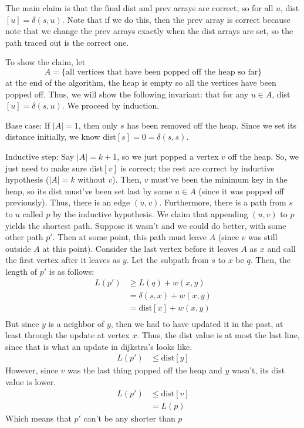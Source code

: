 \begin{algothm}
    The main claim is that the final dist and prev arrays are correct, so for all $u$, dist$[u] = \delta(s, u)$. Note that if we do this,
    then the prev array is correct because note that we change the prev arrays exactly when the dist arrays are set, so the path traced out
    is the correct one.

    To show the claim, let \[A = \{ \text{all vertices that have been popped off the heap so far} \}\]
    at the end of the algorithm, the heap is empty so all the vertices have been popped off. Thus, we will show the following invariant:
    that for any $u \in A$, dist$[u] = \delta(s, u)$. We proceed by induction.

    Base case: If $|A| = 1$, then only $s$ has been removed off the heap. Since we set its distance initially, we know dist$[s] = 0 = \delta(s, s)$.

    Inductive step: Say $|A| = k + 1$, so we just popped a vertex $v$ off the heap. So, we just need to make sure dist$[v]$ is correct; the rest are correct
    by inductive hypothesis ($|A| = k$ without $v$). Then, $v$ must've been the minimum key in the heap, so its dist must've been set last by some $u \in A$ (since it was popped off previously).
    Thus, there is an edge $(u, v)$. Furthermore, there is a path from $s$ to $u$ called $p$ by the inductive hypothesis. We claim that appending $(u, v)$ to $p$
    yields the shortest path. Suppose it wasn't and we could do better, with some other path $p'$. Then at some point, this path must leave $A$ (since $v$ was still outside $A$ at this point).
    Consider the last vertex before it leaves $A$ as $x$ and call the first vertex after it leaves as $y$. Let the subpath from $s$ to $x$ be $q$. Then, the length of $p'$ is as follows:
    \begin{align*}
        L(p') &\geq L(q) + w(x, y) \\
        &= \delta(s, x) + w(x, y) \\
        &= \text{dist}[x] + w(x, y) \\
    \end{align*} 
    But since $y$ is a neighbor of $y$, then we had to have updated it in the past, at least through the update at vertex $x$. Thus,
    the dist value is at most the last line, since that is what an update in dijkstra's looks like.
    \begin{align*}
        L(p') &\leq \text{dist}[y]
    \end{align*}
    However, since $v$ was the last thing popped off the heap and $y$ wasn't, its dist value is lower.
    \begin{align*}
        L(p') &\leq \text{dist}[v] \\
        &= L(p)
    \end{align*}
    Which means that $p'$ can't be any shorter than $p$
\end{algothm}
